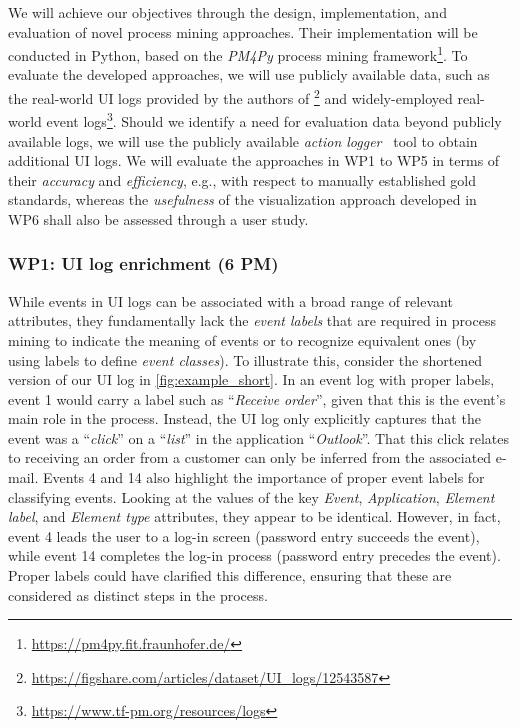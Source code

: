  We will achieve our objectives through the design, implementation, and evaluation of novel process mining approaches. Their implementation will be conducted in Python, based on the \textit{PM4Py} process mining framework\footnote{\url{https://pm4py.fit.fraunhofer.de/}}. 
To evaluate the developed approaches, we will use publicly available data, such as the real-world UI logs  provided by the authors of \cite{leno2020identifying}\footnote{\url{https://figshare.com/articles/dataset/UI\_logs/12543587}} and widely-employed real-world event logs\footnote{\url{https://www.tf-pm.org/resources/logs}}.
Should we identify a need for evaluation data beyond publicly available logs, we will use the publicly available \textit{action logger}~\cite{leno2019action} tool to obtain additional UI logs. 
We will evaluate the approaches in WP1 to WP5 in terms of their \emph{accuracy} and \emph{efficiency}, e.g., with respect to manually established gold standards, whereas the \emph{usefulness} of the visualization approach developed in WP6 shall also be assessed through a user study. 

\vspace{-1em}
\subsubsection{WP1: UI log enrichment (6 PM)}
\label{sec:wp1}

While events in UI logs can be associated with a broad range of relevant attributes, they fundamentally lack the \emph{event labels} that are required in process mining to indicate the meaning of events or to recognize equivalent ones (by using labels to define \emph{event classes}).
To illustrate this, consider the shortened version of our UI log in \autoref{fig:example_short}. 
In an event log with proper labels, event 1 would carry a label such as ``\textit{Receive order}'', given that this is the event's main role in the process. Instead, the UI log only explicitly captures that the event was a ``\textit{click}'' on a ``\textit{list}'' in the application ``\textit{Outlook}''. That this click relates to receiving an order from a customer can only be inferred from the associated e-mail. 
Events 4 and 14 also highlight the importance of proper event labels for classifying events. Looking at the values of the key \textit{Event}, \textit{Application}, \textit{Element label}, and \textit{Element type} attributes, they appear to be identical. However, in fact, event 4 leads the user to a log-in screen (password entry succeeds the event), while event 14 completes the log-in process (password entry precedes the event). Proper labels could have clarified this difference, ensuring that these are considered as distinct steps in the process. 

